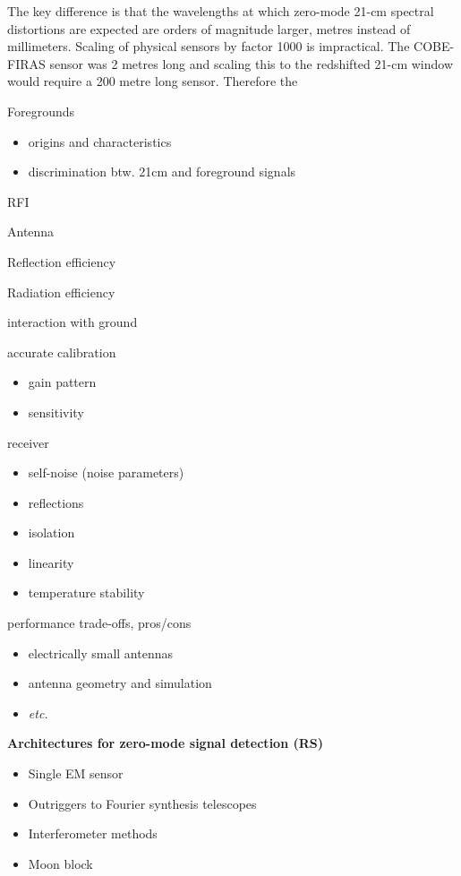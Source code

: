 The key difference is that the wavelengths at which zero-mode 21-cm spectral distortions are expected are orders of magnitude larger, metres instead of millimeters.  Scaling of physical sensors by factor 1000 is impractical.  The COBE-FIRAS sensor was 2 metres long and scaling this to the redshifted 21-cm window would require a 200 metre long sensor.  Therefore the 

Foregrounds

\begin{itemize}
\item
  origins and characteristics
\item
  discrimination btw. 21cm and foreground signals
\end{itemize}

RFI

Antenna

Reflection efficiency

Radiation efficiency

interaction with ground

accurate calibration

\begin{itemize}
\item
  gain pattern
\item
  sensitivity{~}
\end{itemize}

receiver

\begin{itemize}
\item
  self-noise (noise parameters)
\item
  reflections
\item
  isolation
\item
  linearity
\item
  temperature stability
\end{itemize}

performance trade-offs, pros/cons

\begin{itemize}
\item
  electrically small antennas
\item
  antenna geometry and simulation
\item
  \emph{etc.}
\end{itemize}

\textbf{Architectures for zero-mode signal detection (RS)}

\begin{itemize}
\item
  Single EM sensor
\item
  Outriggers to Fourier synthesis telescopes
\item
  Interferometer methods
\item
  Moon block
\end{itemize}

